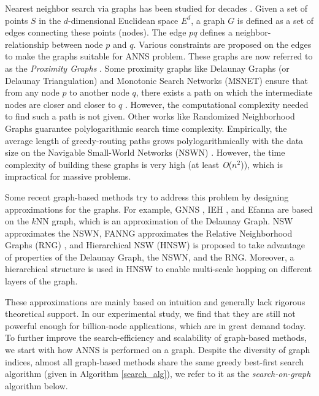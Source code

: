 \documentclass{vldb}
\begin{document}
Nearest neighbor search via graphs has been studied for decades \cite{jaromczyk1992relative, dearholt1988monotonic, arya1993approximate}. Given a set of points $S$ in the $d$-dimensional Euclidean space $E^d$, a graph $G$ is defined as a set of edges connecting these points (nodes). The edge $pq$ defines a neighbor-relationship between node $p$ and $q$. Various constraints are proposed on the edges to make the graphs suitable for ANNS problem. These graphs are now referred to as the \textit{Proximity Graphs} \cite{jaromczyk1992relative}. Some proximity graphs like Delaunay Graphs (or Delaunay Triangulation) \cite{aurenhammer1991voronoi} and Monotonic Search Networks (MSNET) \cite{dearholt1988monotonic} ensure that from any node $p$ to another node $q$, there exists a path on which the intermediate nodes are closer and closer to $q$ \cite{dearholt1988monotonic}. However, the computational complexity needed to find such a path is not given. Other works like Randomized Neighborhood Graphs \cite{arya1993approximate} guarantee polylogarithmic search time complexity. Empirically, the average length of greedy-routing paths grows polylogarithmically with the data size on the Navigable Small-World Networks (NSWN) \cite{kleinberg2000navigation, boguna2009navigability}. However, the time complexity of building these graphs is very high (at least \textit{O}($n^2$)), which is impractical for massive problems. 

Some recent graph-based methods try to address this problem by designing approximations for the graphs. For example, GNNS \cite{Hajebi2011Fast}, IEH \cite{Jin2014Fast}, and Efanna \cite{CongEfanna2016} are based on the $k$NN graph, which is an approximation of the Delaunay Graph. NSW \cite{malkov2014approximate} approximates the NSWN, FANNG \cite{Ben2016Fanng} approximates the Relative Neighborhood Graphs (RNG) \cite{toussaint1980relative}, and Hierarchical NSW (HNSW) \cite{MalkovYHNSW16} is proposed to take advantage of properties of the Delaunay Graph, the NSWN, and the RNG. Moreover, a hierarchical structure is used in HNSW to enable multi-scale hopping on different layers of the graph. 

These approximations are mainly based on intuition and generally lack rigorous theoretical support. In our experimental study, we find that they are still not powerful enough for billion-node applications, which are in great demand today. To further improve the search-efficiency and scalability of graph-based methods, we start with how ANNS is performed on a graph. Despite the diversity of graph indices, almost all graph-based methods \cite{dearholt1988monotonic, arya1993approximate, Ben2016Fanng, malkov2014approximate, Hajebi2011Fast, Jin2014Fast} share the same greedy best-first search algorithm (given in Algorithm \ref{search_alg}), we refer to it as the \textit{search-on-graph} algorithm below.
\end{document}
